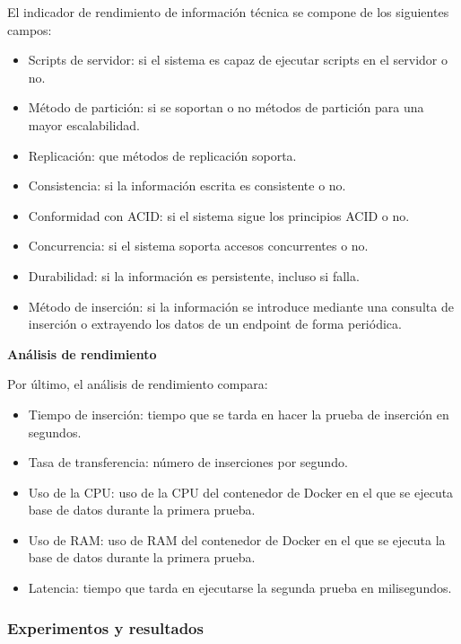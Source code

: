 El indicador de rendimiento de información técnica se compone de los siguientes campos:
\begin{itemize}
    \item Scripts de servidor: si el sistema es capaz de ejecutar scripts en el servidor o no.
    \item Método de partición: si se soportan o no métodos de partición para una mayor escalabilidad.
    \item Replicación: que métodos de replicación soporta.
    \item Consistencia: si la información escrita es consistente o no.
    \item Conformidad con ACID: si el sistema sigue los principios ACID o no.
    \item Concurrencia: si el sistema soporta accesos concurrentes o no.
    \item Durabilidad: si la información es persistente, incluso si falla.
    \item Método de inserción: si la información se introduce mediante una consulta de inserción o extrayendo los
        datos de un endpoint de forma periódica.
\end{itemize}

\textbf{Análisis de rendimiento}

Por último, el análisis de rendimiento compara:
\begin{itemize}
    \item Tiempo de inserción: tiempo que se tarda en hacer la prueba de inserción en segundos.
    \item Tasa de transferencia: número de inserciones por segundo.
    \item Uso de la CPU: uso de la CPU del contenedor de Docker en el que se ejecuta base de datos durante 
        la primera prueba.
    \item Uso de RAM: uso de RAM del contenedor de Docker en el que se ejecuta la base de datos durante la
        primera prueba.
    \item Latencia: tiempo que tarda en ejecutarse la segunda prueba en milisegundos.
\end{itemize}

\subsubsection*{Experimentos y resultados}


